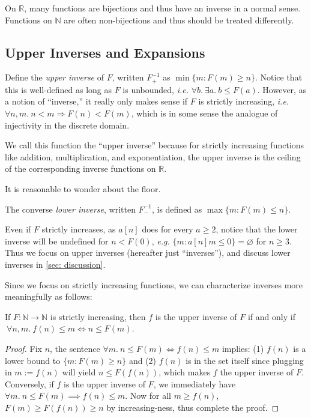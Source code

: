 On $\mathbb{R}$, many functions are bijections and thus have an inverse in a normal sense.  Functions on $\mathbb{N}$ are often non-bijections and thus should be treated differently.

\subsection{Upper Inverses and Expansions}
\begin{defn} \label{defn: inverse}
Define the \emph{upper inverse} of $F$, written $F^{-1}_{+}$ as $\min\{m : F(m)\ge n\}$.
Notice that this is well-defined as long as $F$ is unbounded, \emph{i.e.} $\forall b.~\exists a.~ b \leq F(a)$.  However, as a notion of ``inverse,'' it really only makes sense if $F$ is strictly
increasing, \emph{i.e.} $\forall n,m.~ n < m \Rightarrow F(n) < F(m)$, which is in some sense the analogue of injectivity in the discrete domain.
\end{defn}
We call this function the ``upper inverse'' because for strictly increasing functions like
addition, multiplication, and exponentiation, the upper inverse is the ceiling of the 
corresponding inverse functions on $\mathbb{R}$.  {\color{red} It is reasonable to wonder about the floor.
\begin{defn} \label{defn: lower_inverse}
The converse \emph{lower inverse}, written $F^{-1}_{-}$,
is defined as $\max\{m : F(m)\le n\}$.
\end{defn}
Even if $F$ strictly increases, as $a[n]$ does for every $a\ge 2$, notice that the lower inverse will be undefined for $n < F(0)$, \emph{e.g.} $\{m : a[n]m \le 0 \} = \varnothing$ for $n\ge 3$.
Thus we focus on upper inverses (hereafter just ``inverses''), and discuss lower inverses in \cref{sec: discussion}. } Since we focus on strictly increasing functions, we can characterize inverses more meaningfully as follows:
\begin{thm} \label{thm: upp-inverse-rel}
	If $F:\mathbb{N}\to \mathbb{N}$ is {\color{red} strictly} increasing, then $f$ is the upper inverse of $F$ if and only if $\ \forall n, m.~ f(n)\le m \iff n \le F(m)$.
\end{thm}
\begin{proof}
Fix $n$, the sentence $\forall m.~ n\le F(m) \iff f(n)\le m$ implies: (1) $f(n)$ is a lower bound to $\{m: F(m)\ge n \}$ and (2) $f(n)$ is in the set itself since plugging in $m := f(n)$ will yield $n\le F(f(n))$, which makes $f$ the upper inverse of $F$. Conversely, if $f$ is the upper inverse of $F$, we immediately have $\forall m.~n\le F(m)\implies f(n)\le m$. Now for all $m \ge f(n)$, $F(m)\ge F(f(n)) \ge n$ by increasing-ness, thus complete the proof.
\end{proof}
